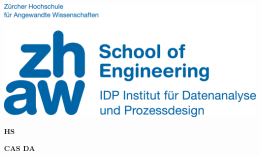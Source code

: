 \noindent
\begin{minipage}[t]{0.4\textwidth} 
\includegraphics[width=\linewidth]{logo.jpg}
\end{minipage}%
\hfill%
\begin{minipage}[t]{0.4\textwidth}\raggedleft
\textbf{\large HS \the\year}
\end{minipage}

\begin{center}
 \textbf{\large CAS DA} \\
 \vspace{0.3cm}
\end{center}
